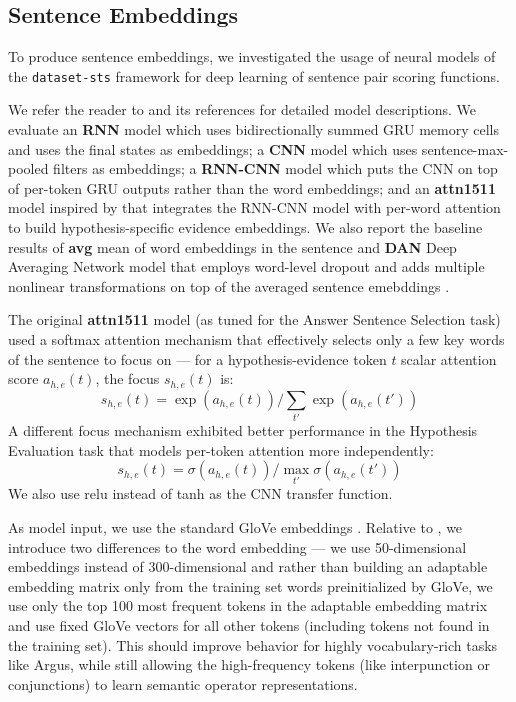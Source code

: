 \documentclass[11pt]{article}
\begin{document}
\subsection{Sentence Embeddings}

To produce sentence embeddings, we investigated the usage
of neural models of the \texttt{dataset-sts} framework
for deep learning of sentence pair scoring functions. \cite{sps}

We refer the reader to \cite{sps} and its references for detailed
model descriptions.  We evaluate an \textbf{RNN} model which uses bidirectionally
summed GRU memory cells and uses the final states as embeddings;
a \textbf{CNN} model which uses sentence-max-pooled filters as embeddings;
a \textbf{RNN-CNN} model which puts the CNN on top of per-token GRU outputs
rather than the word embeddings; and an \textbf{attn1511} model
inspired by \cite{attn1511} that integrates the RNN-CNN model
with per-word attention to build hypothesis-specific evidence embeddings.
We also report the baseline results of
\textbf{avg} mean of word embeddings in the sentence
and \textbf{DAN} Deep Averaging Network model that employs word-level dropout
and adds multiple nonlinear transformations on top of the averaged sentence
emebddings \cite{DAN}.

The original \textbf{attn1511} model \cite{sps} (as tuned for the Answer Sentence Selection task)
used a softmax attention mechanism that effectively selects only a few key words
of the sentence to focus on --- for a hypothesis-evidence token $t$ scalar attention score $a_{h,e}(t)$,
the focus $s_{h,e}(t)$ is:
$$ s_{h,e}(t) = \exp(a_{h,e}(t)) / \sum_{t'} \exp(a_{h,e}(t')) $$
A different focus mechanism exhibited better performance in the Hypothesis Evaluation task
that models per-token attention more independently:
$$ s_{h,e}(t) = \sigma(a_{h,e}(t)) / \max_{t'} \sigma(a_{h,e}(t')) $$
We also use relu instead of tanh as the CNN transfer function.

As model input, we use the standard GloVe embeddings \cite{GloVe}.
Relative to \cite{sps}, we introduce two differences to the word
embedding --- we use 50-dimensional embeddings instead of 300-dimensional
and rather than building an adaptable embedding matrix only from the
training set words preinitialized by GloVe, we use only the top 100
most frequent tokens in the adaptable embedding matrix and use
fixed GloVe vectors for all other tokens (including tokens not
found in the training set).  This should improve behavior for highly
vocabulary-rich tasks like Argus, while still allowing the high-frequency
tokens (like interpunction or conjunctions) to learn semantic operator representations.
\end{document}
